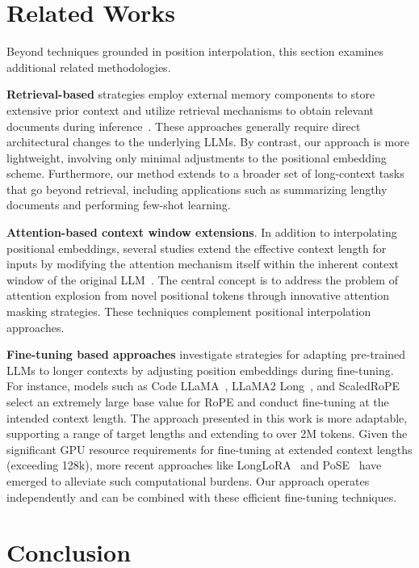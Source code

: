 \section{Related Works}

Beyond techniques grounded in position interpolation, this section examines additional related methodologies.

\textbf{Retrieval-based} strategies employ external memory components to store extensive prior context and utilize retrieval mechanisms to obtain relevant documents during inference~\cite{longllama,wang2023augmenting,borgeaud2022improving}. These approaches generally require direct architectural changes to the underlying LLMs. By contrast, our approach is more lightweight, involving only minimal adjustments to the positional embedding scheme. Furthermore, our method extends to a broader set of long-context tasks that go beyond retrieval, including applications such as summarizing lengthy documents and performing few-shot learning.

\textbf{Attention-based context window extensions}. In addition to interpolating positional embeddings, several studies extend the effective context length for inputs by modifying the attention mechanism itself within the inherent context window of the original LLM~\cite{han2023lminfinite, streamingllm,parallelwindow}. The central concept is to address the problem of attention explosion from novel positional tokens through innovative attention masking strategies. These techniques complement positional interpolation approaches.

\textbf{Fine-tuning based approaches} investigate strategies for adapting pre-trained LLMs to longer contexts by adjusting position embeddings during fine-tuning. For instance, models such as Code LLaMA~\cite{codellama}, LLaMA2 Long~\cite{xiong2023effective}, and ScaledRoPE~\cite{liu2023scaling} select an extremely large base value for RoPE and conduct fine-tuning at the intended context length. The approach presented in this work is more adaptable, supporting a range of target lengths and extending to over 2M tokens. Given the significant GPU resource requirements for fine-tuning at extended context lengths (exceeding 128k), more recent approaches like LongLoRA~\cite{longlora} and PoSE~\cite{zhu2023pose} have emerged to alleviate such computational burdens. Our approach operates independently and can be combined with these efficient fine-tuning techniques.

\section{Conclusion}

